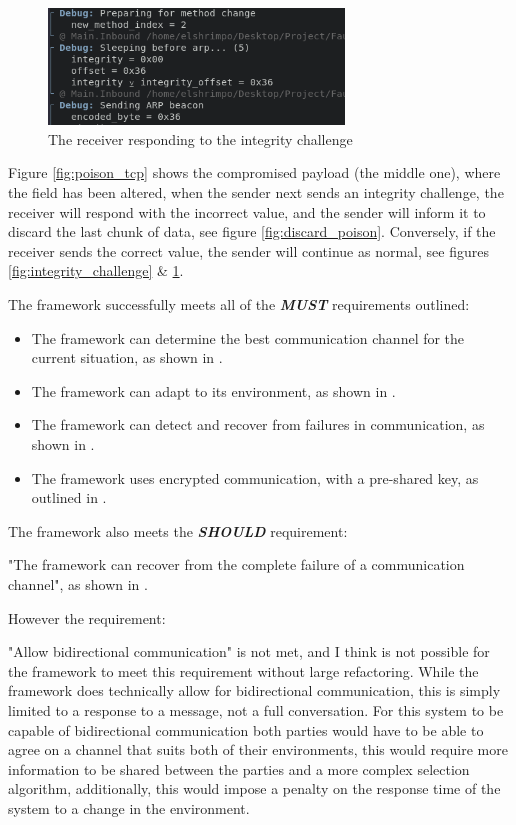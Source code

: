 \begin{figure}
    \centering
    \includegraphics[width=0.7\textwidth]{fig/integrity_response.png}
    \caption{The receiver responding to the integrity challenge}
    \label{fig:integrity_response}
\end{figure}

Figure \ref{fig:poison_tcp} shows the compromised payload (the middle one), where the field has been altered, when the sender next sends an integrity challenge, the receiver will respond with the incorrect value, and the sender will inform it to discard the last chunk of data, see figure \ref{fig:discard_poison}. Conversely, if the receiver sends the correct value, the sender will continue as normal, see figures \ref{fig:integrity_challenge} \& \ref{fig:integrity_response}.

The framework successfully meets all of the \textit{\textbf{MUST}} requirements outlined:

\begin{itemize}
    \item The framework can determine the best communication channel for the current situation, as shown in .
    \item The framework can adapt to its environment, as shown in .
    \item The framework can detect and recover from failures in communication, as shown in .
    \item The framework uses encrypted communication, with a pre-shared key, as outlined in .
\end{itemize}

The framework also meets the \textit{\textbf{SHOULD}} requirement:

"The framework can recover from the complete failure of a communication channel", as shown in .

However the requirement:

"Allow bidirectional communication" is not met, and I think is not possible for the framework to meet this requirement without large refactoring. While the framework does technically allow for bidirectional communication, this is simply limited to a response to a message, not a full conversation. For this system to be capable of bidirectional communication both parties would have to be able to agree on a channel that suits both of their environments, this would require more information to be shared between the parties and a more complex selection algorithm, additionally, this would impose a penalty on the response time of the system to a change in the environment.

